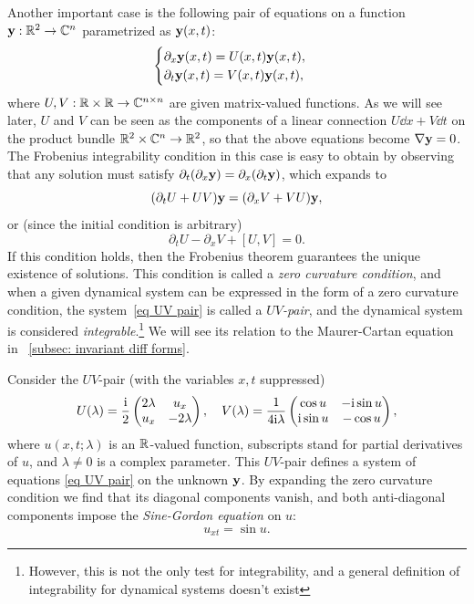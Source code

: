 \begin{example}\label{ex UV pairs}
    Another important case is the following pair of equations on a function $\bf{y}:\bbR^2\to \bbC^n$ parametrized as $\bf{y}(x,t)$:
    \[\begin{cases}
        \partial_x \bf{y}(x,t)= U(x,t)\bf{y}(x,t),\\
        \partial_t \bf{y}(x,t)= V(x,t)\bf{y}(x,t),
    \end{cases}\label{eq UV pair}\]
    where $U,V:\bbR\times\bbR\to \bbC^{n\times n}$ are given matrix-valued functions. As we will see later, $U$ and $V$ can be seen as the components of a linear connection $U\dd x+V\dd t$ on the product bundle $\bbR^2\times\bbC^n\to \bbR^2$, so that the above equations become $\nabla\bf{y}=0$. The Frobenius integrability condition in this case is easy to obtain by observing that any solution must satisfy $\partial_t(\partial_x \bf{y})=\partial_x(\partial_t \bf{y})$, which expands to 
    \[(\partial_t U+UV)\bf{y}=(\partial_x V+VU)\bf{y},\]
    or (since the initial condition is arbitrary)
    \[\partial_t U-\partial_x V+[U,V]=0.\]
    If this condition holds, then the Frobenius theorem guarantees the unique existence of solutions. This condition is called a \emph{zero curvature condition}, and when a given dynamical system can be expressed in the form of a zero curvature condition, the system~\eqref{eq UV pair} is called a \emph{$UV$-pair}, and the dynamical system is considered \emph{integrable}.\footnote{However, this is not the only test for integrability, and a general definition of integrability for dynamical systems doesn't exist} We will see its relation to the Maurer-Cartan equation in \sect\ \ref{subsec: invariant diff forms}.
\end{example}

\begin{example}\label{ex sine-gordon}
    Consider the $UV$-pair (with the variables $x,t$ suppressed)
    \[U(\lambda)=\frac{\rmi}{2}\begin{pmatrix}
        2\lambda & u_x\\
        u_x & -2\lambda
    \end{pmatrix},\quad 
    V(\lambda)=\frac{1}{4\rmi \lambda}\begin{pmatrix}
        \cos u & -\rmi \sin u\\
        \rmi \sin u & -\cos u
    \end{pmatrix},
    \]
    where $u(x,t;\lambda)$ is an $\bbR$-valued function, subscripts stand for partial derivatives of $u$, and $\lambda\neq 0$ is a complex parameter. This $UV$-pair defines a system of equations \eqref{eq UV pair} on the unknown $\bf{y}$. By expanding the zero curvature condition we find that its diagonal components vanish, and both anti-diagonal components impose the \emph{Sine-Gordon equation} on $u$:
    \[u_{xt}=\sin u.\]
\end{example}

